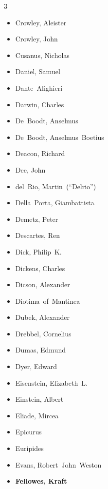 \documentclass[10pt,makeidx]{extreport}
\begin{document}
\begin{multicols}{3}
\begin{itemize}
		\item Crowley, Aleister
		\item Crowley, John
		\item Cusanus, Nicholas
		\item Daniel, Samuel
		\item Dante~Alighieri
		\item Darwin, Charles
		\item De~Boodt, Anselmus
		\item De~Boodt, Anselmus~Boetius
		\item Deacon, Richard
		\item Dee, John
		\item del~Rio, Martin~(“Delrio”)
		\item Della~Porta, Giambattista
		\item Demetz, Peter
		\item Descartes, Ren
		\item Dick, Philip~K.
		\item Dickens, Charles
		\item Dicson, Alexander
		\item Diotima~of~Mantinea
		\item Dubek, Alexander
		\item Drebbel, Cornelius
		\item Dumas, Edmund
		\item Dyer, Edward
		\item Eisenstein, Elizabeth~L.
		\item Einstein, Albert
		\item Eliade, Mircea
		\item Epicurus
		\item Euripides
		\item Evans, Robert~John~Weston
		\item \textbf{Fellowes, Kraft}

\end{itemize}
\end{multicols}
\end{document}
